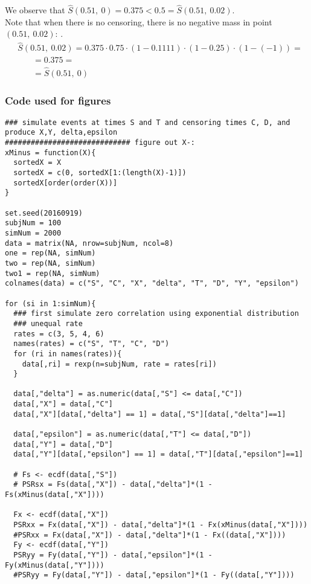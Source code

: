 \documentclass[]{article}
\begin{document}
We observe that $\hat{S}(0.51,~0) = 0.375 < 0.5 = \hat{S}(0.51,~0.02)$.\\

Note that when there is no censoring, there is no negative mass in point $(0.51,~0.02)$: .
	$$
	\begin{aligned}
		&\hat{S}(0.51,~0.02) = 0.375 \cdot 0.75 \cdot (1-0.1111)\cdot (1-0.25)\cdot (1-(-1)) = \\
    &~~~~~~~~ = 0.375 = \\
    &~~~~~~~~ =\hat{S}(0.51,~0)
	\end{aligned}
	$$


\subsubsection{Code used for figures}
{\tiny{
\begin{verbatim}
### simulate events at times S and T and censoring times C, D, and produce X,Y, delta,epsilon
############################# figure out X-:
xMinus = function(X){
  sortedX = X
  sortedX = c(0, sortedX[1:(length(X)-1)])
  sortedX[order(order(X))]
}

set.seed(20160919)
subjNum = 100
simNum = 2000
data = matrix(NA, nrow=subjNum, ncol=8)
one = rep(NA, simNum)
two = rep(NA, simNum)
two1 = rep(NA, simNum)
colnames(data) = c("S", "C", "X", "delta", "T", "D", "Y", "epsilon")

for (si in 1:simNum){
  ### first simulate zero correlation using exponential distribution
  ### unequal rate
  rates = c(3, 5, 4, 6)
  names(rates) = c("S", "T", "C", "D")
  for (ri in names(rates)){
    data[,ri] = rexp(n=subjNum, rate = rates[ri])
  }

  data[,"delta"] = as.numeric(data[,"S"] <= data[,"C"])
  data[,"X"] = data[,"C"]
  data[,"X"][data[,"delta"] == 1] = data[,"S"][data[,"delta"]==1]

  data[,"epsilon"] = as.numeric(data[,"T"] <= data[,"D"])
  data[,"Y"] = data[,"D"]
  data[,"Y"][data[,"epsilon"] == 1] = data[,"T"][data[,"epsilon"]==1]

  # Fs <- ecdf(data[,"S"])
  # PSRsx = Fs(data[,"X"]) - data[,"delta"]*(1 - Fs(xMinus(data[,"X"])))

  Fx <- ecdf(data[,"X"])
  PSRxx = Fx(data[,"X"]) - data[,"delta"]*(1 - Fx(xMinus(data[,"X"])))
  #PSRxx = Fx(data[,"X"]) - data[,"delta"]*(1 - Fx((data[,"X"])))
  Fy <- ecdf(data[,"Y"])
  PSRyy = Fy(data[,"Y"]) - data[,"epsilon"]*(1 - Fy(xMinus(data[,"Y"])))
  #PSRyy = Fy(data[,"Y"]) - data[,"epsilon"]*(1 - Fy((data[,"Y"])))


\end{verbatim}}}
\end{document}

